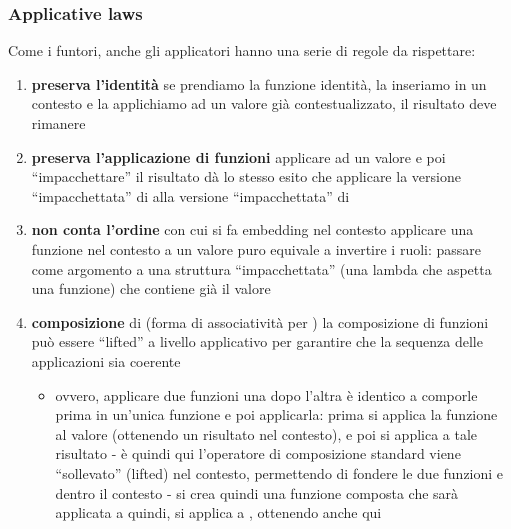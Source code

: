 \subsubsection{Applicative laws}
Come i funtori, anche gli applicatori hanno una serie di regole da rispettare:
\begin{enumerate}
    \item \code{<*>} \textbf{preserva l'identità} 
        \subitem {}
        \subitem se prendiamo la funzione identità, la inseriamo in un contesto e la applichiamo ad un valore  già contestualizzato, il risultato deve rimanere 
    \item \code{<*>} \textbf{preserva l'applicazione di funzioni}
        \subitem {}
        \subitem applicare  ad un valore  e poi ``impacchettare'' il risultato dà lo stesso esito che applicare la versione ``impacchettata'' di  alla versione ``impacchettata'' di 
    \item \textbf{non conta l'ordine} con cui si fa embedding nel contesto
        \subitem {}
        \subitem applicare una funzione nel contesto  a un valore puro  equivale a invertire i ruoli: passare  come argomento a una struttura ``impacchettata'' (una lambda che aspetta una funzione) che contiene già il valore 
    \item \textbf{composizione} di \code{<*>}
        \subitem {}
        \subitem (forma di associatività per \code{<*>})
        \subitem la composizione di funzioni  può essere ``lifted'' a livello applicativo per garantire che la sequenza delle applicazioni sia coerente
\begin{itemize}
    \item ovvero, applicare due funzioni una dopo l'altra è identico a comporle prima in un'unica funzione e poi applicarla:
        \subitem {}
        \subitem prima si applica la funzione  al valore  (ottenendo un risultato nel contesto), e poi si applica  a tale risultato - è quindi 
    \subitem {}
\subitem qui l'operatore di composizione standard  viene ``sollevato'' (lifted) nel contesto, permettendo di fondere le due funzioni  e  dentro il contesto - si crea quindi una funzione composta che sarà applicata a 
\subitem quindi, si applica  a , ottenendo anche qui 
\end{itemize}
\end{enumerate}

